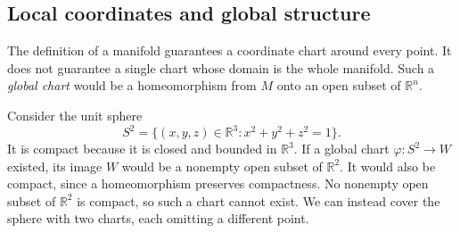 \documentclass[11pt,a4paper]{article}
\numberwithin{equation}{section}
\newcommand{\R}{\mathbb R}
\newcommand{\slideref}[1]{\par\nobreak\smallskip\nobreak{\footnotesize\color{ink!60}\textsc{Source slide #1}}\par\nobreak\smallskip\nobreak}
\begin{document}
\subsection{Local coordinates and global structure}
\slideref{6}

The definition of a manifold guarantees a coordinate chart around every
point. It does not guarantee a single chart whose domain is the whole
manifold. Such a \emph{global chart} would be a homeomorphism from \(M\)
onto an open subset of \(\R^n\).

Consider the unit sphere
\[
 S^2=\{(x,y,z)\in\R^3:x^2+y^2+z^2=1\}.
\]
It is compact because it is closed and bounded in \(\R^3\). If a global
chart \(\varphi:S^2\to W\) existed, its image \(W\) would be a nonempty
open subset of \(\R^2\). It would also be compact, since a homeomorphism
preserves compactness. No nonempty open subset of \(\R^2\) is compact,
so such a chart cannot exist. We can instead cover the sphere with two
charts, each omitting a different point.
\end{document}
